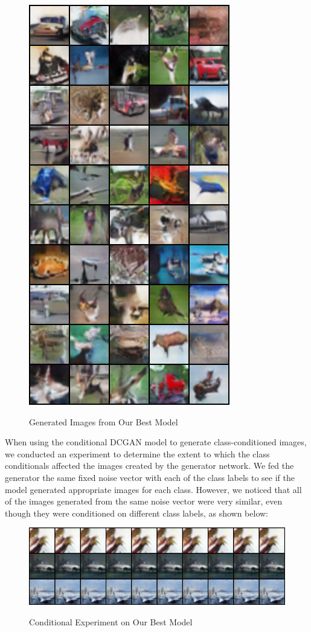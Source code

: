 \documentclass[a4paper]{article}
\begin{document}
\begin{figure}[H]
  \includegraphics[scale=0.5]{images/conditional_400_10x5_generated.png}
  \label{fig:boat1}
  \caption{Generated Images from Our Best Model}
\end{figure}
When using the conditional DCGAN model to generate class-conditioned images, we conducted an experiment to determine the extent to which the class conditionals affected the images created by the generator network. We fed the generator the same fixed noise vector with each of the class labels to see if the model generated appropriate images for each class.  However, we noticed that all of the images generated from the same noise vector were very similar, even though they were conditioned on different class labels, as shown below:
\begin{figure}[H]
  \includegraphics[scale=0.5]{images/conditional_400_fixed_noise_conditional_fake.png}
  \label{fig:boat1}
  \caption{Conditional Experiment on Our Best Model}
\end{figure}
\end{document}
